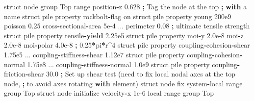 \documentclass[a4paper, nobind]{templates/ociamthesis}
\newenvironment{Shaded}{\begin{snugshade}}{\end{snugshade}}
\newcommand{\BuiltInTok}[1]{#1}
\newcommand{\ControlFlowTok}[1]{\textcolor[rgb]{0.13,0.29,0.53}{\textbf{#1}}}
\newcommand{\DecValTok}[1]{\textcolor[rgb]{0.00,0.00,0.81}{#1}}
\newcommand{\FloatTok}[1]{\textcolor[rgb]{0.00,0.00,0.81}{#1}}
\newcommand{\NormalTok}[1]{#1}
\newcommand{\OperatorTok}[1]{\textcolor[rgb]{0.81,0.36,0.00}{\textbf{#1}}}
\newcommand{\StringTok}[1]{\textcolor[rgb]{0.31,0.60,0.02}{#1}}
\renewenvironment{Shaded}
{
  \vspace{10pt}%
  \begin{snugshade}%
}{%
  \end{snugshade}%
  \vspace{8pt}%
}
\begin{document}
\begin{Shaded}
\begin{Highlighting}[]
\NormalTok{    struct node group }\StringTok{\textquotesingle{}Top\textquotesingle{}} \BuiltInTok{range}\NormalTok{ position}\OperatorTok{{-}}\NormalTok{z }\FloatTok{0.628} \OperatorTok{;}\NormalTok{ Tag the node at the top }
                                                   \OperatorTok{;} \ControlFlowTok{with}\NormalTok{ a name}
\NormalTok{    struct pile }\BuiltInTok{property}\NormalTok{ rockbolt}\OperatorTok{{-}}\NormalTok{flag on}
\NormalTok{    struct pile }\BuiltInTok{property}\NormalTok{ young }\FloatTok{200e9}\NormalTok{ poisson }\FloatTok{0.25}\NormalTok{ cross}\OperatorTok{{-}}\NormalTok{sectional}\OperatorTok{{-}}\NormalTok{area }\FloatTok{5e{-}4}\NormalTok{ ...}
\NormalTok{                         perimeter }\FloatTok{0.08}
    \OperatorTok{;}\NormalTok{ ultimate tensile strength}
\NormalTok{    struct pile }\BuiltInTok{property}\NormalTok{ tensile}\OperatorTok{{-}}\ControlFlowTok{yield}   \FloatTok{2.25e5}
\NormalTok{    struct pile }\BuiltInTok{property}\NormalTok{ moi}\OperatorTok{{-}}\NormalTok{y }\FloatTok{2.0e{-}8}\NormalTok{ moi}\OperatorTok{{-}}\NormalTok{z }\FloatTok{2.0e{-}8}\NormalTok{ moi}\OperatorTok{{-}}\NormalTok{polar }\FloatTok{4.0e{-}8}
    \OperatorTok{;}                         \FloatTok{0.25}\OperatorTok{*}\NormalTok{pi}\OperatorTok{*}\NormalTok{r}\OperatorTok{\^{}}\DecValTok{4}
\NormalTok{    struct pile }\BuiltInTok{property}\NormalTok{ coupling}\OperatorTok{{-}}\NormalTok{cohesion}\OperatorTok{{-}}\NormalTok{shear }\FloatTok{1.75e5}\NormalTok{ ...}
\NormalTok{                         coupling}\OperatorTok{{-}}\NormalTok{stiffness}\OperatorTok{{-}}\NormalTok{shear }\FloatTok{1.12e7}
\NormalTok{    struct pile }\BuiltInTok{property}\NormalTok{ coupling}\OperatorTok{{-}}\NormalTok{cohesion}\OperatorTok{{-}}\NormalTok{normal }\FloatTok{1.75e8}\NormalTok{ ...}
\NormalTok{                         coupling}\OperatorTok{{-}}\NormalTok{stiffness}\OperatorTok{{-}}\NormalTok{normal }\FloatTok{1.0e9}
\NormalTok{    struct pile }\BuiltInTok{property}\NormalTok{ coupling}\OperatorTok{{-}}\NormalTok{friction}\OperatorTok{{-}}\NormalTok{shear }\FloatTok{30.0}
    \OperatorTok{;}\NormalTok{ Set up shear test (need to fix local nodal axes at the top node, }
    \OperatorTok{;}\NormalTok{ to avoid axes rotating }\ControlFlowTok{with}\NormalTok{ element)}
\NormalTok{    struct node fix system}\OperatorTok{{-}}\NormalTok{local }\BuiltInTok{range}\NormalTok{ group }\StringTok{\textquotesingle{}Top\textquotesingle{}}
\NormalTok{    struct node initialize velocity}\OperatorTok{{-}}\NormalTok{x }\FloatTok{1e{-}6}\NormalTok{ local }\BuiltInTok{range}\NormalTok{ group }\StringTok{\textquotesingle{}Top\textquotesingle{}}

\end{Highlighting}
\end{Shaded}
\end{document}
